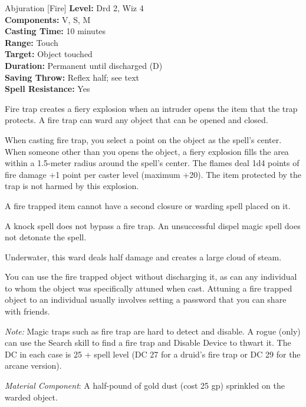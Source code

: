 {Abjuration [Fire]}
{
	\textbf{Level:}
	Drd 2, Wiz 4\\
	\textbf{Components:}
	V, S, M\\
	\textbf{Casting Time:}
	10 minutes\\
	\textbf{Range:}
	Touch\\
	\textbf{Target:}
	Object touched\\
	\textbf{Duration:}
	Permanent until discharged (D)\\
	\textbf{Saving Throw:}
	Reflex half; see text\\
	\textbf{Spell Resistance:}
	Yes\\
}
{
	Fire trap creates a fiery explosion when an intruder opens the item that the trap protects. A fire trap can ward any object that can be opened and closed.

	When casting fire trap, you select a point on the object as the spell's center. When someone other than you opens the object, a fiery explosion fills the area within a 1.5-meter radius around the spell's center. The flames deal 1d4 points of fire damage +1 point per caster level (maximum +20). The item protected by the trap is not harmed by this explosion.

	A fire trapped item cannot have a second closure or warding spell placed on it.

	A knock spell does not bypass a fire trap.  An unsuccessful dispel magic spell does not detonate the spell.

	Underwater, this ward deals half damage and creates a large cloud of steam.

	You can use the fire trapped object without discharging it, as can any individual to whom the object was specifically attuned when cast. Attuning a fire trapped object to an individual usually involves setting a password that you can share with friends.

	\textit{Note:} Magic traps such as fire trap are hard to detect and disable. A rogue (only) can use the Search skill to find a fire trap and Disable Device to thwart it. The DC in each case is 25 + spell level (DC 27 for a druid's fire trap or DC 29 for the arcane version).

	\textit{Material Component}:
	A half-pound of gold dust (cost 25 gp) sprinkled on the warded object.

}
